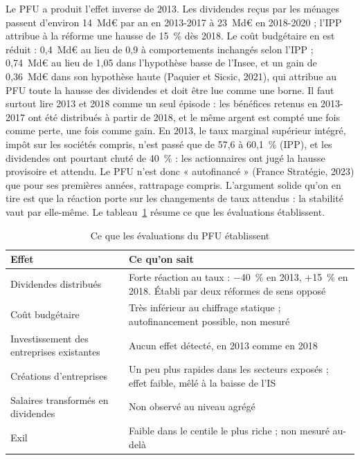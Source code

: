 \documentclass[11pt,a4paper]{article}
\begin{document}
Le PFU a produit l'effet inverse de 2013. Les dividendes reçus par les ménages passent d'environ 14~Md€ par an
en 2013-2017 à 23~Md€ en 2018-2020 ; l'IPP attribue à la réforme une hausse de 15~\% dès 2018. Le coût
budgétaire en est réduit : 0,4~Md€ au lieu de 0,9 à comportements inchangés selon l'IPP ; 0,74~Md€ au lieu de
1,05 dans l'hypothèse basse de l'Insee, et un gain de 0,36~Md€ dans son hypothèse haute (Paquier et Sicsic,
2021), qui attribue au PFU toute la hausse des dividendes et doit être lue comme une borne. Il faut surtout
lire 2013 et 2018 comme un seul épisode : les bénéfices retenus en 2013-2017 ont été distribués à partir de
2018, et le même argent est compté une fois comme perte, une fois comme gain. En 2013, le taux marginal
supérieur intégré, impôt sur les sociétés compris, n'est passé que de 57,6 à 60,1~\% (IPP), et les dividendes
ont pourtant chuté de 40~\% : les actionnaires ont jugé la hausse provisoire et attendu. Le PFU n'est donc
« autofinancé » (France Stratégie, 2023) que pour ses premières années, rattrapage compris. L'argument solide
qu'on en tire est que la réaction porte sur les changements de taux attendus : la stabilité vaut par
elle-même. Le tableau~\ref{tab:etabli} résume ce que les évaluations établissent.

\begin{table}[!htbp]\centering\small
\caption{Ce que les évaluations du PFU établissent}\label{tab:etabli}
\begin{tabularx}{\linewidth}{@{}>{\raggedright\arraybackslash}p{4.6cm}>{\raggedright\arraybackslash}X@{}}
\toprule
Effet & Ce qu'on sait \\
\midrule
Dividendes distribués & Forte réaction au taux : $-$40~\% en 2013, +15~\% en 2018. Établi par deux réformes de sens opposé \\
Coût budgétaire & Très inférieur au chiffrage statique ; autofinancement possible, non mesuré \\
Investissement des entreprises existantes & Aucun effet détecté, en 2013 comme en 2018 \\
Créations d'entreprises & Un peu plus rapides dans les secteurs exposés ; effet faible, mêlé à la baisse de l'IS \\
Salaires transformés en dividendes & Non observé au niveau agrégé \\
Exil & Faible dans le centile le plus riche ; non mesuré au-delà \\
\bottomrule
\end{tabularx}
\par\vspace{2pt}{\scriptsize\raggedright Sources : Bach et al. (2019) ; Paquier et Sicsic (2021) ; France
Stratégie (2023) ; IPP (2023) ; CAE, Focus n°~118 (2025).\par}
\end{table}
\end{document}
